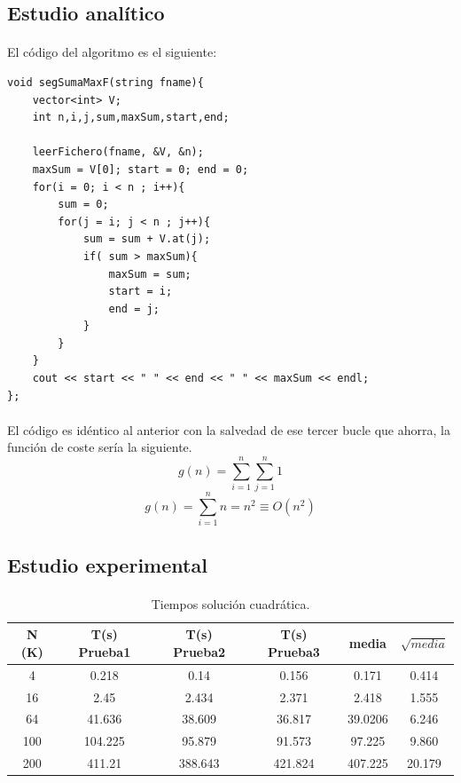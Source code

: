 \documentclass[es]{ifirak}
\begin{document}
\subsection{Estudio analítico}

\paragraph{}
El código del algoritmo es el siguiente:
\begin{lstlisting}
void segSumaMaxF(string fname){
	vector<int> V;
	int n,i,j,sum,maxSum,start,end;
	
	leerFichero(fname, &V, &n);
	maxSum = V[0]; start = 0; end = 0;
	for(i = 0; i < n ; i++){
		sum = 0;
		for(j = i; j < n ; j++){
			sum = sum + V.at(j);
			if( sum > maxSum){
				maxSum = sum;
				start = i;
				end = j;
			}
		}
	}
	cout << start << " " << end << " " << maxSum << endl;
};
\end{lstlisting}
\paragraph{}
El código es idéntico al anterior con la salvedad de ese tercer bucle que ahorra, la función de coste sería la siguiente.
$$g(n)= \sum_{i=1}^{n}\sum_{j=1}^{n} 1 $$
$$g(n)=\sum_{i=1}^{n}n = n^{2} \equiv O(n^{2})$$
\subsection{Estudio experimental}
\paragraph{}
\begin{table}[htbp]
	\centering
	\begin{tabular}{c|c|c|c|c|c}
		N (K) & T(s) Prueba1 & T(s) Prueba2 & T(s) Prueba3 & media & $\sqrt{media}$\\
		\hline
		4 & 0.218& 0.14 & 0.156& 0.171 & 0.414\\
		16 & 2.45 & 2.434& 2.371& 2.418  &	1.555\\
		64 & 41.636 & 38.609& 36.817& 39.0206 &	6.246\\
		100 & 104.225  & 95.879& 91.573& 97.225	& 9.860\\
		200 &  411.21 & 388.643& 421.824& 407.225 & 	20.179\\
	\end{tabular}
	\caption{Tiempos solución cuadrática.}\label{table}
\end{table}
\end{document}
